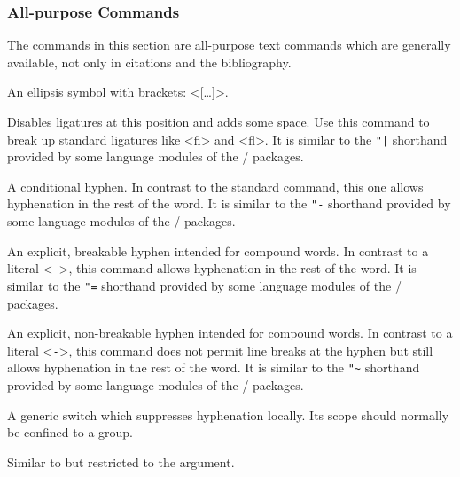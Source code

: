 \documentclass{ltxdockit}[2011/03/25]
\begin{document}
\subsubsection{All-purpose Commands}
\label{use:fmt:aux}

The commands in this section are all-purpose text commands which are generally available, not only in citations and the bibliography.

\begin{ltxsyntax}


An ellipsis symbol with brackets: <[\dots\unkern]>.


Disables ligatures at this position and adds some space. Use this command to break up standard ligatures like <fi> and <fl>. It is similar to the \verb+"|+ shorthand provided by some language modules of the / packages.


A conditional hyphen. In contrast to the standard \cmd{-} command, this one allows hyphenation in the rest of the word. It is similar to the \verb|"-| shorthand provided by some language modules of the / packages.


An explicit, breakable hyphen intended for compound words. In contrast to a literal <\texttt{-}>, this command allows hyphenation in the rest of the word. It is similar to the \verb|"=| shorthand provided by some language modules of the / packages.


An explicit, non-breakable hyphen intended for compound words. In contrast to a literal <\texttt{-}>, this command does not permit line breaks at the hyphen but still allows hyphenation in the rest of the word. It is similar to the \verb|"~| shorthand provided by some language modules of the / packages.


A generic switch which suppresses hyphenation locally. Its scope should normally be confined to a group.


Similar to  but restricted to the  argument.



\end{ltxsyntax}
\end{document}
